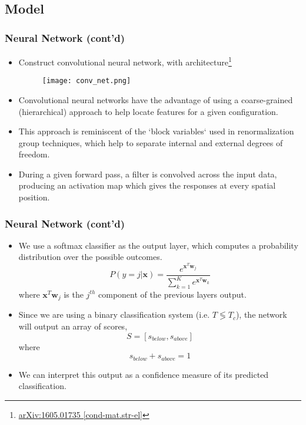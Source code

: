 \documentclass{beamer}
\begin{document}
\subsection{Model}
\begin{frame}
\frametitle{Neural Network (cont'd)}
	\begin{itemize}
		\item Construct convolutional neural network, with architecture\footnote[frame]{\href{https://arxiv.org/pdf/1605.01735.pdf}{arXiv:1605.01735 [cond-mat.str-el]}}
			\begin{figure}
				\texttt{[image: conv\_net.png]}
			\end{figure}
		\item Convolutional neural networks have the advantage of using a coarse-grained (hierarchical) approach to help locate features for a given configuration.
		\item This approach is reminiscent of the `block variables` used in renormalization group techniques, which help to separate internal and external degrees of freedom.
		\item During a given forward pass, a filter is convolved across the input data, producing an activation map which gives the responses at every spatial position.



	\end{itemize}
\end{frame}



\begin{frame}
\frametitle{Neural Network (cont'd)}
	\begin{itemize}
		\item We use a softmax classifier as the output layer, which computes a probability distribution over the possible outcomes.
			\begin{equation}
				P(y=j|\mathbf{x}) = \frac{e^{\mathbf{x}^{T} \mathbf{w}_{j}}}{\sum_{k=1}^{K} e^{\mathbf{x}^{T}\mathbf{w}_{k}}}
			\end{equation}
			where $\mathbf{x}^{T}\mathbf{w}_{j}$ is the $j^{th}$ component of the previous layers output.
		\item Since we are using a binary classification system (i.e. $T \lessgtr T_{c}$), the network will output an array of scores,
			$$S = \left[s_{below}, s_{above}\right]$$
			where
			$$s_{below} + s_{above} = 1 $$
		\item We can interpret this output as a confidence measure of its predicted classification.
	\end{itemize}
\end{frame}
\end{document}

